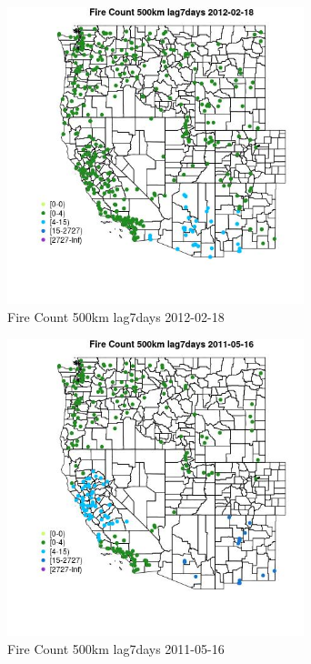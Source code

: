 \begin{figure} 
\centering  
\includegraphics[width=0.77\textwidth]{Code_Outputs/Report_ML_input_PM25_Step4_part_f_de_duplicated_aveswNAs_MapObsFire_Count_500km_lag7days2012-02-18.jpg} 
\caption{\label{fig:Report_ML_input_PM25_Step4_part_f_de_duplicated_aveswNAsMapObsFire_Count_500km_lag7days2012-02-18}Fire Count 500km lag7days 2012-02-18} 
\end{figure} 
 

\begin{figure} 
\centering  
\includegraphics[width=0.77\textwidth]{Code_Outputs/Report_ML_input_PM25_Step4_part_f_de_duplicated_aveswNAs_MapObsFire_Count_500km_lag7days2011-05-16.jpg} 
\caption{\label{fig:Report_ML_input_PM25_Step4_part_f_de_duplicated_aveswNAsMapObsFire_Count_500km_lag7days2011-05-16}Fire Count 500km lag7days 2011-05-16} 
\end{figure} 
 

